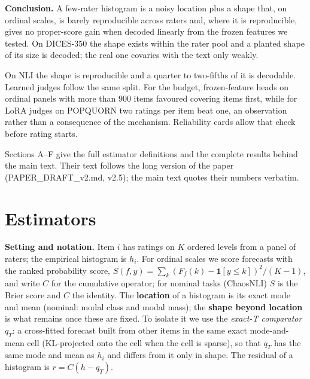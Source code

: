 \documentclass{article}
\begin{document}
\textbf{Conclusion.} A few-rater histogram is a noisy location plus a shape that, on ordinal scales, is barely reproducible across raters and, where it is reproducible, gives no proper-score gain when decoded linearly from the frozen features we tested. On DICES-350 the shape exists within the rater pool and a planted shape of its size is decoded; the real one covaries with the text only weakly.

On NLI the shape is reproducible and a quarter to two-fifths of it is decodable. Learned judges follow the same split. For the budget, frozen-feature heads on ordinal panels with more than 900 items favoured covering items first, while for LoRA judges on POPQUORN two ratings per item beat one, an observation rather than a consequence of the mechanism. Reliability cards allow that check before rating starts.



\newpage
\appendix
\onecolumn

Sections A--F give the full estimator definitions and the complete results behind the main text. Their text follows the long version of the paper (PAPER\_DRAFT\_v2.md, v2.5); the main text quotes their numbers verbatim.

\section{Estimators}

\textbf{Setting and notation.} Item \(i\) has ratings on \(K\) ordered levels from a panel of raters; the empirical histogram is \(h_i\). For ordinal scales we score forecasts with the ranked probability score, \(S(f,y)=\sum_k (F_f(k)-\mathbf 1[y\le k])^2/(K-1)\), and write \(C\) for the cumulative operator; for nominal tasks (ChaosNLI) \(S\) is the Brier score and \(C\) the identity. The \textbf{location} of a histogram is its exact mode and mean (nominal: modal class and modal mass); the \textbf{shape beyond location} is what remains once these are fixed. To isolate it we use the \emph{exact-T comparator} \(q_T\): a cross-fitted forecast built from other items in the same exact mode-and-mean cell (KL-projected onto the cell when the cell is sparse), so that \(q_T\) has the same mode and mean as \(h_i\) and differs from it only in shape. The residual of a histogram is \(r = C(h - q_T)\).
\end{document}
